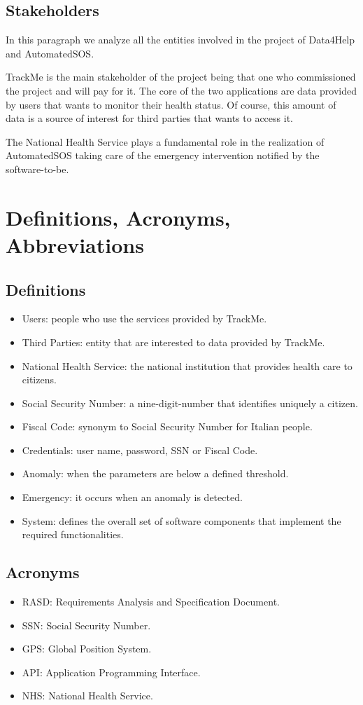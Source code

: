 \subsection{Stakeholders}
In this paragraph we analyze all the entities involved in the project of Data4Help and AutomatedSOS.
\par TrackMe is the main stakeholder of the project being that one who commissioned the project and will pay for it.
The core of the two applications are data provided by users that wants to monitor their health status.
Of course, this amount of data is a source of interest for third parties that wants to access it.
\par The National Health Service plays a fundamental role in the realization of AutomatedSOS taking care of the emergency intervention notified by the software-to-be.

\section{Definitions, Acronyms, Abbreviations}
\subsection{Definitions}
\begin{itemize}
    \item Users: people who use the services provided by TrackMe.
    \item Third Parties: entity that are interested to data provided by TrackMe.
    \item National Health Service: the national institution that provides health care to citizens.
    \item Social Security Number: a nine-digit-number that identifies uniquely a citizen.
    \item Fiscal Code: synonym to Social Security Number for Italian people.
    \item Credentials: user name, password, SSN or Fiscal Code.
    \item Anomaly: when the parameters are below a defined threshold. 
    \item Emergency: it occurs when an anomaly is detected.
    \item System: defines the overall set of software components that implement the required functionalities.
\end{itemize}

\subsection{Acronyms}
\begin{itemize}
    \item RASD: Requirements Analysis and Specification Document. 
    \item SSN: Social Security Number.
    \item GPS: Global Position System.
    \item API: Application Programming Interface.
    \item NHS: National Health Service.
\end{itemize}

